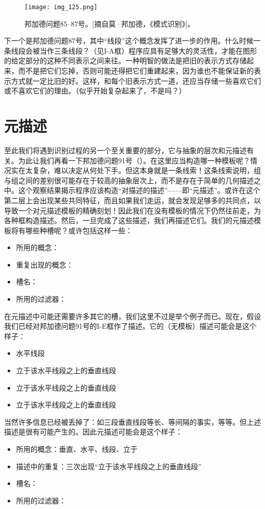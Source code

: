 \begin{figure}
\texttt{[image: img\_125.png]}
\caption[邦加德问题85--87号。]
  {邦加德问题85--87号。[摘自莫·邦加德，《模式识别》]。}
\end{figure}

下一个是邦加德问题87号，其中“线段”这个概念发挥了进一步的作用。什么时候一条线段会被当作三条线段？（见I-A框）程序应具有足够大的灵活性，才能在图形的给定部分的这种不同表示之间来往。一种明智的做法是把旧的表示方式存储起来，而不是把它们忘掉，否则可能还得把它们重建起来，因为谁也不能保证新的表示方式就一定比旧的好。这样，和每个旧表示方式一道，还应当存储一些喜欢它们或不喜欢它们的理由。（似乎开始复杂起来了，不是吗？）

\section{元描述}

至此我们将遇到识别过程的另一个至关重要的部分，它与抽象的层次和元描述有关。为此让我们再看一下邦加德问题91号（）。在这里应当构造哪一种模板呢？情况实在太复杂，难以决定从何处下手。但这本身就是一条线索！这条线索说明，组与组之间的差别很可能存在于较高的抽象层次上，而不是存在于简单的几何描述之中。这个观察结果揭示程序应该构造“对描述的描述”——即“元描述”。或许在这个第二层上会出现某些共同特征，而且如果我们走运，就会发现足够多的共同点，以导致一个对元描述模板的精确刻划！因此我们在没有模板的情况下仍然往前走，为各种框构造描述。然后，一旦完成了这些描述，我们再描述它们。我们的元描述模板将有哪些种槽呢？或许包括这样一些：
\begin{itemize}
\item 所用的概念：\blankline
\item 重复出现的概念：\blankline
\item 槽名：\blankline
\item 所用的过滤器：\blankline
\end{itemize}
在元描述中可能还需要许多其它的槽，我们这里不过是举个例子而已。现在，假设我们已经对邦加德问题91号的I-E框作了描述。它的（无模板）描述可能会是这个样子：
\begin{itemize}
\item 水平线段
\item 立于该水平线段之上的垂直线段
\item 立于该水平线段之上的垂直线段
\item 立于该水平线段之上的垂直线段
\end{itemize}

当然许多信息已经被丢掉了：如三段垂直线段等长、等间隔的事实，等等。但上述描述是很有可能产生的。因此元描述可能会是这个样子：
\begin{itemize}
\item 所用的概念：垂直、水平、线段、立于
\item 描述中的重复：三次出现“立于该水平线段之上的垂直线段”
\item 槽名：\blankline
\item 所用的过滤器：\blankline
\end{itemize}

